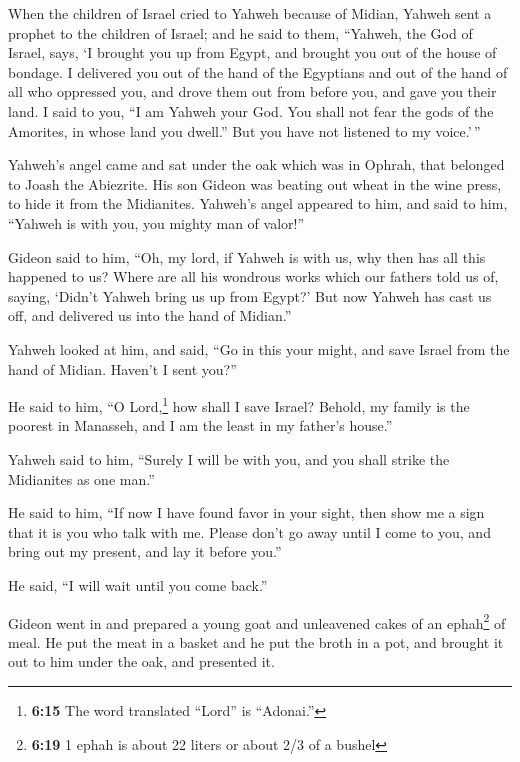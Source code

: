  When the children of Israel cried to Yahweh because of
Midian,  Yahweh sent a prophet to the children of Israel;
and he said to them, ``Yahweh, the God of Israel, says, `I brought you
up from Egypt, and brought you out of the house of bondage.
 I delivered you out of the hand of the Egyptians and out
of the hand of all who oppressed you, and drove them out from before
you, and gave you their land.  I said to you, ``I am
Yahweh your God. You shall not fear the gods of the Amorites, in whose
land you dwell.'' But you have not listened to my voice.'\,''

 Yahweh's angel came and sat under the oak which was in
Ophrah, that belonged to Joash the Abiezrite. His son Gideon was beating
out wheat in the wine press, to hide it from the Midianites.
 Yahweh's angel appeared to him, and said to him,
``Yahweh is with you, you mighty man of valor!''

 Gideon said to him, ``Oh, my lord, if Yahweh is with us,
why then has all this happened to us? Where are all his wondrous works
which our fathers told us of, saying, `Didn't Yahweh bring us up from
Egypt?' But now Yahweh has cast us off, and delivered us into the hand
of Midian.''

 Yahweh looked at him, and said, ``Go in this your might,
and save Israel from the hand of Midian. Haven't I sent you?''

 He said to him, ``O Lord,\footnote{\textbf{6:15} The
  word translated ``Lord'' is ``Adonai.''} how shall I save Israel?
Behold, my family is the poorest in Manasseh, and I am the least in my
father's house.''

 Yahweh said to him, ``Surely I will be with you, and you
shall strike the Midianites as one man.''

 He said to him, ``If now I have found favor in your
sight, then show me a sign that it is you who talk with me.
 Please don't go away until I come to you, and bring out
my present, and lay it before you.''

He said, ``I will wait until you come back.''

 Gideon went in and prepared a young goat and unleavened
cakes of an ephah\footnote{\textbf{6:19} 1 ephah is about 22 liters or
  about 2/3 of a bushel} of meal. He put the meat in a basket and he put
the broth in a pot, and brought it out to him under the oak, and
presented it.


